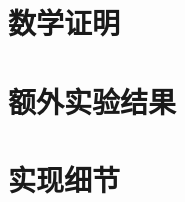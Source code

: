\documentclass[conference]{IEEEtran}
\begin{document}
\begin{CJK}{UTF8}{gbsn}



\appendix

\section{数学证明}
\label{app:proofs}


\section{额外实验结果}
\label{app:results}


\section{实现细节}
\label{app:implementation}


\end{CJK}
\end{document}
